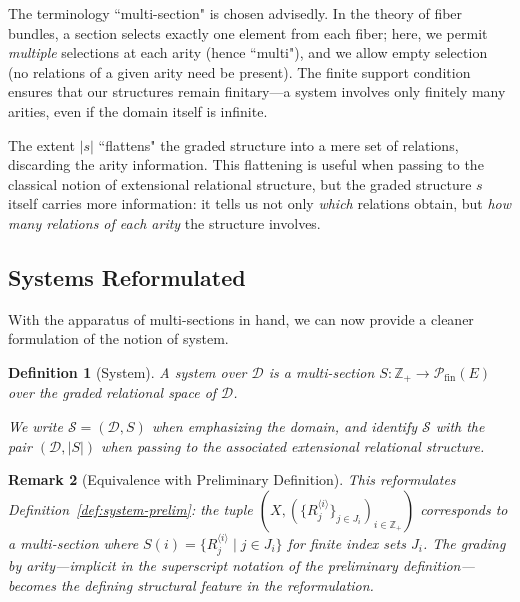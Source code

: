 \documentclass[12pt,a4paper]{article}
\newtheorem{definition}{Definition}[section]
\newtheorem{remark}[definition]{Remark}
\newcommand{\domain}{\mathcal{D}}
\newcommand{\pfin}{\mathcal{P}_{\mathrm{fin}}}
\begin{document}
The terminology ``multi-section" is chosen advisedly. In the theory of fiber bundles, a section selects exactly one element from each fiber; here, we permit \emph{multiple} selections at each arity (hence ``multi"), and we allow empty selection (no relations of a given arity need be present). The finite support condition ensures that our structures remain finitary---a system involves only finitely many arities, even if the domain itself is infinite.

The extent $|s|$ ``flattens" the graded structure into a mere set of relations, discarding the arity information. This flattening is useful when passing to the classical notion of extensional relational structure, but the graded structure $s$ itself carries more information: it tells us not only \emph{which} relations obtain, but \emph{how many relations of each arity} the structure involves.

\subsection{Systems Reformulated}

With the apparatus of multi-sections in hand, we can now provide a cleaner formulation of the notion of system.

\begin{definition}[System]
\label{def:system}
A \emph{system} over $\domain$ is a multi-section $S : \mathbb{Z}_+ \to \pfin(E)$ over the graded relational space of $\domain$.

We write $\mathcal{S} = (\domain, S)$ when emphasizing the domain, and identify $\mathcal{S}$ with the pair $(\domain, |S|)$ when passing to the associated extensional relational structure.
\end{definition}

\begin{remark}[Equivalence with Preliminary Definition]
This reformulates Definition~\ref{def:system-prelim}: the tuple $(X, (\{R^{\langle i \rangle}_j\}_{j \in J_i})_{i \in \mathbb{Z}_+})$ corresponds to a multi-section where $S(i) = \{R^{\langle i \rangle}_j \mid j \in J_i\}$ for finite index sets $J_i$. The grading by arity---implicit in the superscript notation of the preliminary definition---becomes the defining structural feature in the reformulation.
\end{remark}
\end{document}
